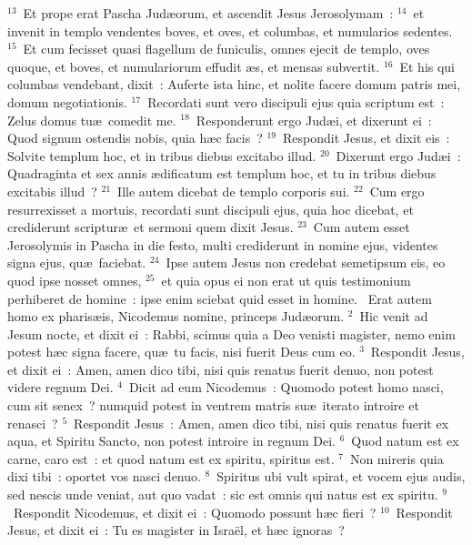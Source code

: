 ${}^{13}$~Et prope erat Pascha Jud\ae orum, et ascendit Jesus Jerosolymam~:
${}^{14}$~et invenit in templo vendentes boves, et oves, et columbas, et numularios sedentes.
${}^{15}$~Et cum fecisset quasi flagellum de funiculis, omnes ejecit de templo, oves quoque, et boves, et numulariorum effudit \ae s, et mensas subvertit.
${}^{16}$~Et his qui columbas vendebant, dixit~: Auferte ista hinc, et nolite facere domum patris mei, domum negotiationis.
${}^{17}$~Recordati sunt vero discipuli ejus quia scriptum est~: Zelus domus tu\ae\ comedit me.
${}^{18}$~Responderunt ergo Jud\ae i, et dixerunt ei~: Quod signum ostendis nobis, quia h\ae c facis~?
${}^{19}$~Respondit Jesus, et dixit eis~: Solvite templum hoc, et in tribus diebus excitabo illud.
${}^{20}$~Dixerunt ergo Jud\ae i~: Quadraginta et sex annis \ae dificatum est templum hoc, et tu in tribus diebus excitabis illud~?
${}^{21}$~Ille autem dicebat de templo corporis sui.
${}^{22}$~Cum ergo resurrexisset a mortuis, recordati sunt discipuli ejus, quia hoc dicebat, et crediderunt scriptur\ae\ et sermoni quem dixit Jesus.
${}^{23}$~Cum autem esset Jerosolymis in Pascha in die festo, multi crediderunt in nomine ejus, videntes signa ejus, qu\ae\ faciebat.
${}^{24}$~Ipse autem Jesus non credebat semetipsum eis, eo quod ipse nosset omnes,
${}^{25}$~et quia opus ei non erat ut quis testimonium perhiberet de homine~: ipse enim sciebat quid esset in homine.
~\lettrine[lines=10,image=true,loversize=0.05,lraise=-0.03]{E}{}rat autem homo ex pharis\ae is, Nicodemus nomine, princeps Jud\ae orum.
${}^{2}$~Hic venit ad Jesum nocte, et dixit ei~: Rabbi, scimus quia a Deo venisti magister, nemo enim potest h\ae c signa facere, qu\ae\ tu facis, nisi fuerit Deus cum eo.
${}^{3}$~Respondit Jesus, et dixit ei~: Amen, amen dico tibi, nisi quis renatus fuerit denuo, non potest videre regnum Dei.
${}^{4}$~Dicit ad eum Nicodemus~: Quomodo potest homo nasci, cum sit senex~? numquid potest in ventrem matris su\ae\ iterato introire et renasci~?
${}^{5}$~Respondit Jesus~: Amen, amen dico tibi, nisi quis renatus fuerit ex aqua, et Spiritu Sancto, non potest introire in regnum Dei.
${}^{6}$~Quod natum est ex carne, caro est~: et quod natum est ex spiritu, spiritus est.
${}^{7}$~Non mireris quia dixi tibi~: oportet vos nasci denuo.
${}^{8}$~Spiritus ubi vult spirat, et vocem ejus audis, sed nescis unde veniat, aut quo vadat~: sic est omnis qui natus est ex spiritu.
${}^{9}$~Respondit Nicodemus, et dixit ei~: Quomodo possunt h\ae c fieri~?
${}^{10}$~Respondit Jesus, et dixit ei~: Tu es magister in Isra\"el, et h\ae c ignoras~?
